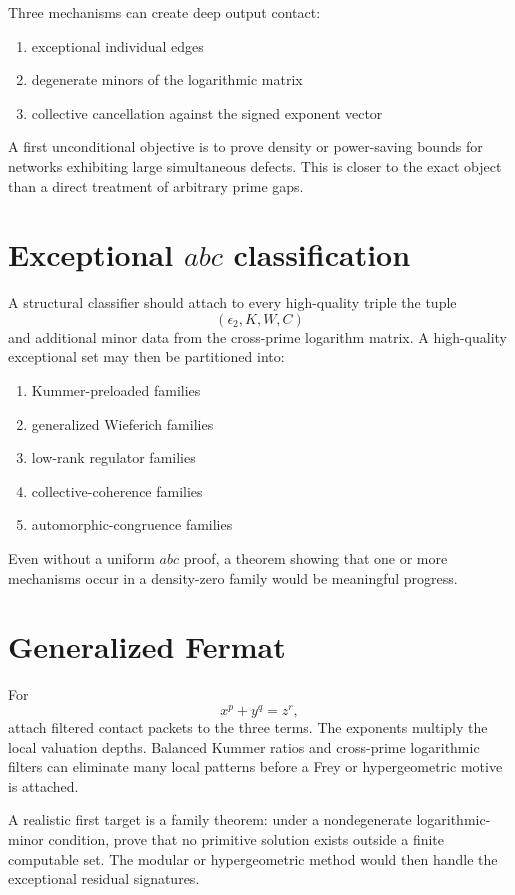 Three mechanisms can create deep output contact:

\begin{enumerate}[leftmargin=1.5em]
\item exceptional individual edges
\item degenerate minors of the logarithmic matrix
\item collective cancellation against the signed exponent vector
\end{enumerate}

A first unconditional objective is to prove density or power-saving bounds for networks exhibiting large simultaneous defects. This is closer to the exact object than a direct treatment of arbitrary prime gaps.

\section{Exceptional \texorpdfstring{$abc$}{abc} classification}
A structural classifier should attach to every high-quality triple the tuple
\[
 (\epsilon_2,K,W,C)
\]
and additional minor data from the cross-prime logarithm matrix. A high-quality exceptional set may then be partitioned into:

\begin{enumerate}[leftmargin=1.5em]
\item Kummer-preloaded families
\item generalized Wieferich families
\item low-rank regulator families
\item collective-coherence families
\item automorphic-congruence families
\end{enumerate}

Even without a uniform $abc$ proof, a theorem showing that one or more mechanisms occur in a density-zero family would be meaningful progress.

\section{Generalized Fermat}
For
\[
 x^p+y^q=z^r,
\]
attach filtered contact packets to the three terms. The exponents multiply the local valuation depths. Balanced Kummer ratios and cross-prime logarithmic filters can eliminate many local patterns before a Frey or hypergeometric motive is attached.

A realistic first target is a family theorem: under a nondegenerate logarithmic-minor condition, prove that no primitive solution exists outside a finite computable set. The modular or hypergeometric method would then handle the exceptional residual signatures.

